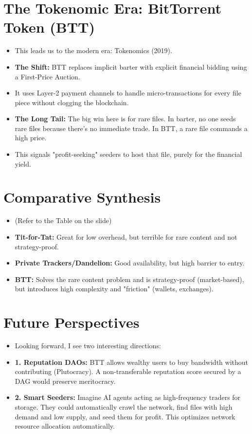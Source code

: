 \documentclass[11pt, letterpaper]{article}
\begin{document}
\section{The Tokenomic Era: BitTorrent Token (BTT)}
\begin{itemize}
    \item This leads us to the modern era: Tokenomics (2019).
    \item \textbf{The Shift:} BTT replaces implicit barter with explicit financial bidding using a First-Price Auction.
    \item It uses Layer-2 payment channels to handle micro-transactions for every file piece without clogging the blockchain.
    \item \textbf{The Long Tail:} The big win here is for rare files. In barter, no one seeds rare files because there's no immediate trade. In BTT, a rare file commands a high price.
    \item This signals "profit-seeking" seeders to host that file, purely for the financial yield.
\end{itemize}

\section{Comparative Synthesis}
\begin{itemize}
    \item (Refer to the Table on the slide)
    \item \textbf{Tit-for-Tat:} Great for low overhead, but terrible for rare content and not strategy-proof.
    \item \textbf{Private Trackers/Dandelion:} Good availability, but high barrier to entry.
    \item \textbf{BTT:} Solves the rare content problem and is strategy-proof (market-based), but introduces high complexity and "friction" (wallets, exchanges).
\end{itemize}

\section{Future Perspectives}
\begin{itemize}
    \item Looking forward, I see two interesting directions:
    \item \textbf{1. Reputation DAOs:} BTT allows wealthy users to buy bandwidth without contributing (Plutocracy). A non-transferable reputation score secured by a DAG would preserve meritocracy.
    \item \textbf{2. Smart Seeders:} Imagine AI agents acting as high-frequency traders for storage. They could automatically crawl the network, find files with high demand and low supply, and seed them for profit. This optimizes network resource allocation automatically.
\end{itemize}
\end{document}
